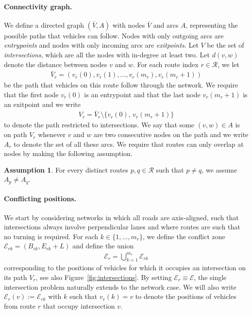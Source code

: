 \documentclass[a4paper]{report}
\theoremstyle{definition}
\newtheorem{assump}{Assumption}[chapter]
\theoremstyle{plain}
\begin{document}
\paragraph{Connectivity graph.}
We define a directed graph $(\bar{V},A)$ with nodes $\bar{V}$ and arcs $A$,
representing the possible paths that vehicles can follow. Nodes with only
outgoing arcs are \textit{entrypoints} and nodes with only incoming arcs are \textit{exitpoints}.
Let $V$ be the set of \textit{intersections}, which are all the nodes with
in-degree at least two.
%
Let $d(v, w)$ denote the distance between nodes $v$ and $w$.
%
For each route index $r \in \mathcal{R}$, we let
\begin{align*}
  \bar{V}_{r} = (v_{r}(0), v_{r}(1), \dots, v_{r}(m_{r}), v_{r}(m_{r}+1))
\end{align*}
be the path that vehicles on this route follow through the network. We require
that the first node $v_{r}(0)$ is an entrypoint and that the last node
$v_{r}(m_{r}+1)$ is an exitpoint and we write
\begin{align*}
  V_{r} = \bar{V}_{r} \setminus \{ v_{r}(0), \, v_{r}(m_{r}+1) \}
\end{align*}
to denote the path restricted to intersections. We say that some $(v, w) \in A$
is on path $V_{r}$ whenever $v$ and $w$ are two consecutive nodes on the path
and we write $A_{r}$ to denote the set of all these arcs. We require that
routes can only overlap at nodes by making the following assumption.

\begin{assump}\label{assump:disjoint-routes}
  For every distinct routes $p,q \in \mathcal{R}$ such that $p \neq q$, we
  assume $A_{p} \neq A_{q}$.
\end{assump}

\paragraph{Conflicting positions.}
We start by considering networks in which all roads are axis-aligned, such that
intersections always involve perpendicular lanes and where routes are such that
no turning is required. For each $k\in \{1, \dots, m_r\}$, we define the conflict zone
$\mathcal{E}_{rk} = (B_{rk}, E_{rk} + L)$ and define the union
\begin{align*}
  \mathcal{E}_{r} = \bigcup_{k=1}^{m_r} \mathcal{E}_{rk}
\end{align*}
corresponding to the positions of vehicles for which it occupies an intersection
on its path $V_{r}$, see also Figure~\ref{fig:intersections}.
%
By setting $\mathcal{E}_r \equiv \mathcal{E}$, the single intersection problem
naturally extends to the network case.
%
We will also write $\mathcal{E}_r(v) := \mathcal{E}_{rk}$ with $k$ such that
$v_r(k) = v$ to denote the positions of vehicles from route $r$ that occupy
intersection $v$.
\end{document}
